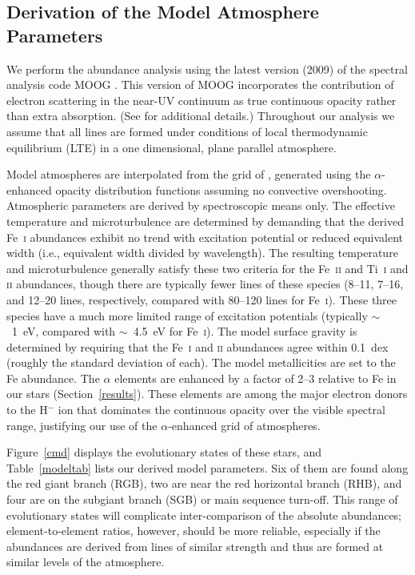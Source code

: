 \documentclass{emulateapj}
\begin{document}
\subsection{Derivation of the Model Atmosphere Parameters}


We perform the abundance analysis using the latest version (2009)
of the spectral analysis code MOOG \citep{sneden73}.
This version of MOOG incorporates the contribution of electron
scattering in the near-UV continuum as true continuous opacity rather
than extra absorption. 
(See \citealt{sobeck10} for additional details.)
Throughout our analysis we assume that all lines are formed under
conditions of local thermodynamic equilibrium (LTE) 
in a one dimensional, plane parallel atmosphere.

Model atmospheres are interpolated from the grid of \citet{castelli03},
generated using the $\alpha$-enhanced opacity distribution functions
assuming no convective overshooting.
Atmospheric parameters are derived by spectroscopic means only.
The effective temperature and microturbulence are determined by
demanding that the 
derived Fe~\textsc{i} abundances exhibit no trend with excitation potential 
or reduced equivalent width (i.e., equivalent width divided by wavelength).
The resulting temperature and microturbulence generally satisfy these
two criteria for the 
Fe~\textsc{ii} and Ti~\textsc{i} and \textsc{ii} abundances,
though there are typically fewer lines of these species
(8--11, 7--16, and 12--20 lines, respectively, compared with
80--120 lines for Fe~\textsc{i}).
These three species have a much 
more limited range of excitation potentials (typically $\sim$~1~eV, 
compared with $\sim$~4.5~eV for Fe~\textsc{i}).
The model surface gravity is determined by requiring that the
Fe~\textsc{i} and \textsc{ii} abundances agree within 0.1~dex 
(roughly the standard deviation of each).
The model metallicities are set to the Fe abundance.
The $\alpha$ elements
are enhanced by a factor of 2--3 relative to Fe in our stars
(Section~\ref{results}).
These elements are among the major electron donors to the 
H$^{-}$ ion that dominates the
continuous opacity over the visible spectral range, 
justifying our use of the $\alpha$-enhanced grid of atmospheres.

Figure~\ref{cmd} displays the evolutionary states of these stars, 
and Table~\ref{modeltab} lists our derived model parameters.
Six of them are found along the red giant branch (RGB),
two are near the red horizontal branch (RHB),
and four are on the subgiant branch (SGB) or main sequence turn-off.  
This range of evolutionary states will complicate inter-comparison of the
absolute abundances; element-to-element ratios, however, should be 
more reliable, especially if the abundances are derived from lines
of similar strength and thus are formed at similar levels of the atmosphere.
\end{document}

